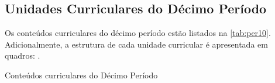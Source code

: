 \clearpage

\subsection{Unidades Curriculares do Décimo Período}

Os conteúdos curriculares do décimo período estão listados na \autoref{tab:per10}. Adicionalmente, a estrutura de cada unidade curricular é apresentada em quadros: .

\begin{table}[!htb]
	\centering\footnotesize
	\caption{Conteúdos curriculares do Décimo Período}
	\label{tab:per10}
\end{table}

\clearpage